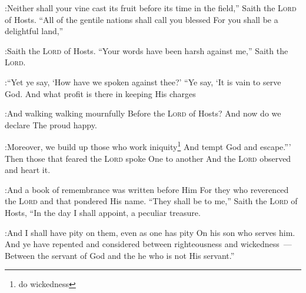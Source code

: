 \begin{enumerate}[align=center]
:Neither shall your vine cast its fruit before its time in the field,'' Saith the \textsc{Lord} of Hosts.%
     ``All of the gentile nations shall call you blessed For you shall be a delightful land,''%

:Saith the \textsc{Lord} of Hosts.%
     ``Your words have been harsh against me,'' Saith the \textsc{Lord}.%

:``Yet ye say, `How have we spoken against thee?'%
     ``Ye say, `It is vain to serve God. And what profit is there in keeping His charges%

:And walking walking mournfully Before the \textsc{Lord} of Hosts?%
     And now do we declare The proud happy.%

:Moreover, we build up those who work iniquity\footnote{do wickedness} And tempt God and escape.'''%
     Then those that feared the \textsc{Lord} spoke One to another And the \textsc{Lord} observed and heart it.%

:And a book of remembrance was written before Him For they who reverenced the \textsc{Lord} and that pondered His name.%
     ``They shall be to me,'' Saith the \textsc{Lord} of Hosts, ``In the day I shall appoint, a peculiar treasure.%

:And I shall have pity on them, even as one has pity On his son who serves him.%
     And ye have repented and considered between righteousness and wickedness~--- Between the servant of God and the he who is not His servant.''%
\end{enumerate}
